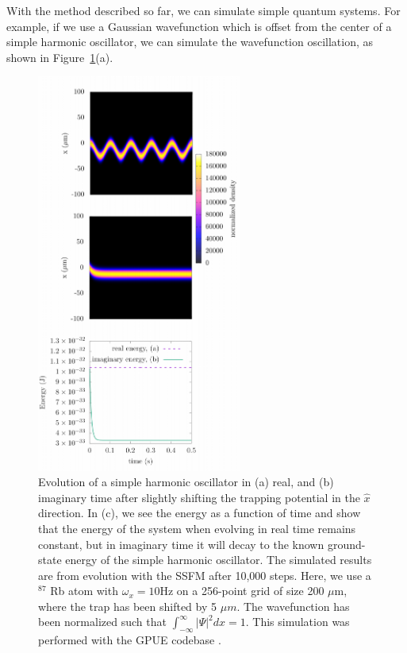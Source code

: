 With the method described so far, we can simulate simple quantum systems.
For example, if we use a Gaussian wavefunction which is offset from the center of a simple harmonic oscillator, we can simulate the wavefunction oscillation, as shown in Figure~\ref{fig:evolve}(a).

\begin{figure}

\center \includegraphics[width=0.6\textwidth]{data/splitop/SHO/SHO_gimp.pdf}

\caption{Evolution of a simple harmonic oscillator in (a) real, and (b) imaginary time after slightly shifting the trapping potential in the $\hat x$ direction.
In (c), we see the energy as a function of time and show that the energy of the system when evolving in real time remains constant, but in imaginary time it will decay to the known ground-state energy of the simple harmonic oscillator.
The simulated results are from evolution with the SSFM after 10,000 steps.
Here, we use a $^87$ Rb atom with $\omega_x = 10$Hz on a 256-point grid of size 200 $\mu$m, where the trap has been shifted by 5 $\mu m$.
The wavefunction has been normalized such that $\int_{-\infty}^\infty|\Psi|^2 dx = 1$.
This simulation was performed with the GPUE codebase \cite{schloss2018}.
}
\label{fig:evolve}
\end{figure}

